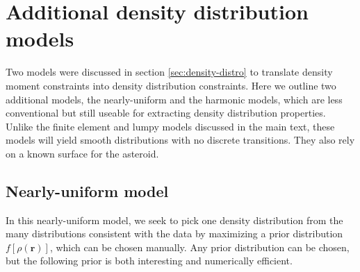 \section{Additional density distribution models}
\label{app:more-models}

Two models were discussed in section \ref{sec:density-distro} to translate density moment constraints into density distribution constraints. Here we outline two additional models, the nearly-uniform and the harmonic models, which are less conventional but still useable for extracting density distribution properties. Unlike the finite element and lumpy models discussed in the main text, these models will yield smooth distributions with no discrete transitions. They also rely on a known surface for the asteroid.

\subsection{Nearly-uniform model}
In this nearly-uniform model, we seek to pick one density distribution from the many distributions consistent with the data by maximizing a prior distribution $f[\rho(\bm r)]$, which can be chosen manually. Any prior distribution can be chosen, but the following prior is both interesting and numerically efficient.

